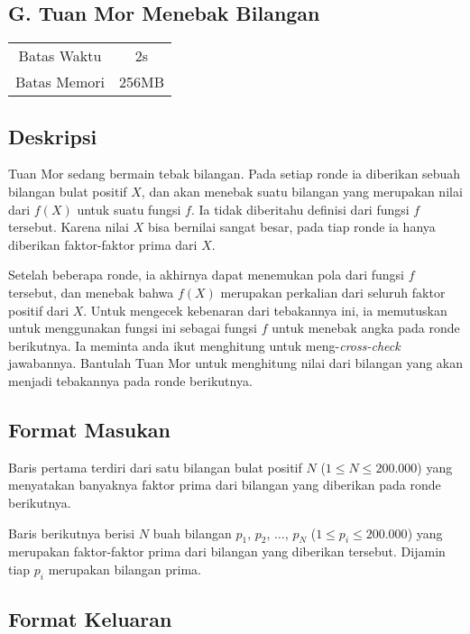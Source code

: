 \documentclass{article}
\begin{document}
\begin{center}
    \section*{G. Tuan Mor Menebak Bilangan}

    \begin{tabular}{ | c c | }
        \hline
        Batas Waktu  & 2s \\ 
        Batas Memori & 256MB \\ 
        \hline
    \end{tabular}
\end{center}

\subsection*{Deskripsi}

Tuan Mor sedang bermain tebak bilangan. Pada setiap ronde ia diberikan sebuah bilangan bulat positif $X$, dan akan menebak suatu bilangan yang merupakan nilai dari $f(X)$ untuk suatu fungsi $f$. Ia tidak diberitahu definisi dari fungsi $f$ tersebut. Karena nilai $X$ bisa bernilai sangat besar, pada tiap ronde ia hanya diberikan faktor-faktor prima dari $X$. 

Setelah beberapa ronde, ia akhirnya dapat menemukan pola dari fungsi $f$ tersebut, dan menebak bahwa $f(X)$ merupakan perkalian dari seluruh faktor positif dari $X$. Untuk mengecek kebenaran dari tebakannya ini, ia memutuskan untuk menggunakan fungsi ini sebagai fungsi $f$ untuk menebak angka pada ronde berikutnya. Ia meminta anda ikut menghitung untuk meng-\textit{cross-check} jawabannya. Bantulah Tuan Mor untuk menghitung nilai dari bilangan yang akan menjadi tebakannya pada ronde berikutnya.

\subsection*{Format Masukan}

Baris pertama terdiri dari satu bilangan bulat positif $N$ ($1 \leq N \leq 200.000$) yang menyatakan banyaknya faktor prima dari bilangan yang diberikan pada ronde berikutnya.

Baris berikutnya berisi $N$ buah bilangan $p_1$, $p_2$, $\dots$, $p_N$ ($1 \leq p_i \leq 200.000$) yang merupakan faktor-faktor prima dari bilangan yang diberikan tersebut. Dijamin tiap $p_i$ merupakan bilangan prima.

\subsection*{Format Keluaran}
\end{document}
